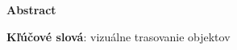 \thispagestyle{plain}

\begin{center}
    \Large{\textbf{Abstract}}
\end{center}


\noindent \textbf{Kľúčové slová}: vizuálne trasovanie objektov
